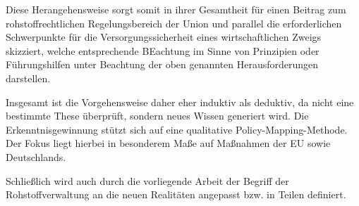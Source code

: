 \documentclass[12pt,a4paper,oneside]{book} %
\begin{document}
Diese Herangehensweise sorgt somit in ihrer Gesamtheit für einen Beitrag zum rohstoffrechtlichen Regelungsbereich der Union und parallel die erforderlichen Schwerpunkte für die Versorgungssicherheit eines wirtschaftlichen Zweigs skizziert, welche entsprechende BEachtung im Sinne von Prinzipien oder Führungshilfen unter Beachtung der oben genannten Herausforderungen darstellen.

Insgesamt ist die Vorgehensweise daher eher induktiv als deduktiv, da nicht eine bestimmte These überprüft, sondern neues Wissen generiert wird. Die Erkenntnisgewinnung stützt sich auf eine qualitative Policy-Mapping-Methode. Der Fokus liegt hierbei in besonderem Maße auf Maßnahmen der EU sowie Deutschlands. 

Schließlich wird auch durch die vorliegende Arbeit der Begriff der Rohstoffverwaltung an die neuen Realitäten angepasst bzw. in Teilen definiert.

\end{document}
